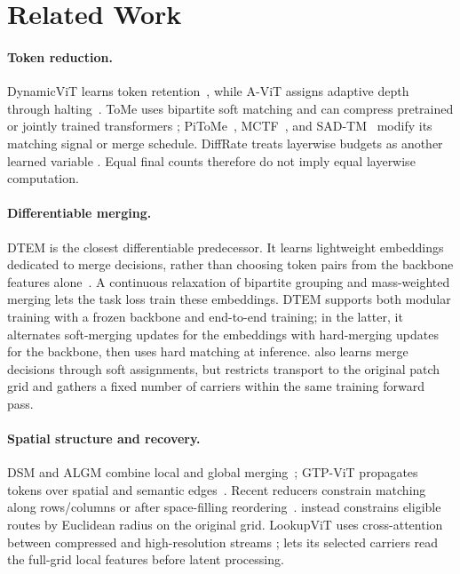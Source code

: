 \section{Related Work}
\label{sec:related-work}

\paragraph{Token reduction.}
DynamicViT learns token retention~\citep{dynamicvit2021}, while A-ViT assigns
adaptive depth through halting~\citep{avit2022}. ToMe uses bipartite soft
matching and can compress pretrained or jointly trained transformers
\citep{tome2023}; PiToMe~\citep{pitome2024}, MCTF~\citep{mctf2024}, and
SAD-TM~\citep{sadtm2026} modify its matching signal or merge schedule.
DiffRate treats layerwise budgets as another learned variable
\citep{diffrate2023}. Equal final counts therefore do not imply equal
layerwise computation.

\paragraph{Differentiable merging.}
DTEM is the closest differentiable predecessor. It learns lightweight
embeddings dedicated to merge decisions, rather than choosing token pairs
from the backbone features alone~\citep{dtem2024}. A continuous relaxation
of bipartite grouping and mass-weighted merging lets the task loss train
these embeddings. DTEM supports both modular training with a frozen backbone
and end-to-end training; in the latter, it alternates soft-merging updates
for the embeddings with hard-merging updates for the backbone, then uses
hard matching at inference. \mn{} also learns merge decisions through soft
assignments, but restricts transport to the original patch grid and gathers
a fixed number of carriers within the same training forward pass.

\paragraph{Spatial structure and recovery.}
DSM and ALGM combine local and global merging~\citep{dsm2024,algm2024};
GTP-ViT propagates tokens over spatial and semantic edges~\citep{gtpvit2024}.
Recent reducers constrain matching along rows/columns or after space-filling
reordering~\citep{cubistmerge2026,napmat2025}. \mn{} instead constrains
eligible routes by Euclidean radius on the original grid. LookupViT uses
cross-attention between compressed and high-resolution streams
\citep{lookupvit2024}; \mn{} lets its selected carriers read the full-grid
local features before latent processing.

